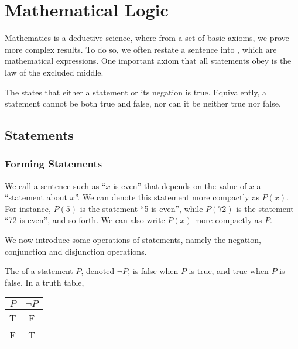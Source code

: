 \chapter{Mathematical Logic}

Mathematics is a deductive science, where from a set of basic axioms, we prove more complex results. To do so, we often restate a sentence into , which are mathematical expressions. One important axiom that all statements obey is the law of the excluded middle.

\begin{axiom}
    The  states that either a statement or its negation is true. Equivalently, a statement cannot be both true and false, nor can it be neither true nor false.
\end{axiom}

\section{Statements}

\subsection{Forming Statements}

We call a sentence such as ``$x$ is even'' that depends on the value of $x$ a ``statement about $x$''. We can denote this statement more compactly as $P(x)$. For instance, $P(5)$ is the statement ``5 is even'', while $P(72)$ is the statement ``72 is even'', and so forth. We can also write $P(x)$ more compactly as $P$.

We now introduce some operations of statements, namely the negation, conjunction and disjunction operations.

\begin{definition}
    The  of a statement $P$, denoted $\lnot P$, is false when $P$ is true, and true when $P$ is false. In a truth table,
    \begin{table}[H]
        \centering
        \begin{tabular}{|c|c|}
        \hline
        $P$ & $\lnot P$ \\ \hline\hline
        T & F \\ \hline
        F & T \\ \hline
        \end{tabular}
    \end{table}
\end{definition}

